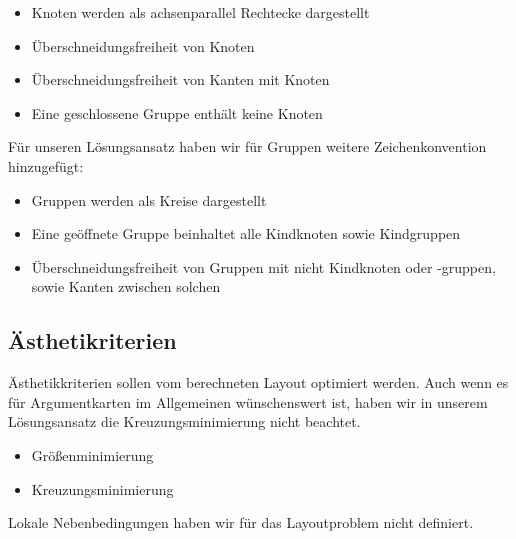 \begin{itemize}
\item Knoten werden als achsenparallel Rechtecke dargestellt
\item Überschneidungsfreiheit von Knoten
\item Überschneidungsfreiheit von Kanten mit Knoten
\item Eine geschlossene Gruppe enthält keine Knoten
\end{itemize}

Für unseren Lösungsansatz haben wir für Gruppen weitere Zeichenkonvention hinzugefügt:
\begin{itemize}
\item Gruppen werden als Kreise dargestellt
\item Eine geöffnete Gruppe beinhaltet alle Kindknoten sowie Kindgruppen
\item Überschneidungsfreiheit von Gruppen mit nicht Kindknoten oder -gruppen, sowie Kanten zwischen solchen
\end{itemize}

\subsection{Ästhetikriterien}
Ästhetikkriterien sollen vom berechneten Layout optimiert werden. 
Auch wenn es für Argumentkarten im Allgemeinen wünschenswert ist, haben wir in unserem Lösungsansatz die Kreuzungsminimierung nicht beachtet.
\begin{itemize}
\item Größenminimierung 
\item Kreuzungsminimierung
\end{itemize}

Lokale Nebenbedingungen haben wir für das Layoutproblem nicht definiert.



